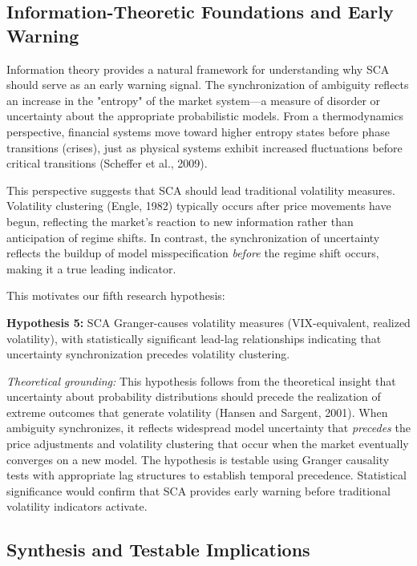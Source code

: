 \documentclass[preprint,12pt,authoryear]{elsarticle}
\begin{document}
\subsection{Information-Theoretic Foundations and Early Warning}

Information theory provides a natural framework for understanding why SCA should serve as an early warning signal. The synchronization of ambiguity reflects an increase in the "entropy" of the market system—a measure of disorder or uncertainty about the appropriate probabilistic models. From a thermodynamics perspective, financial systems move toward higher entropy states before phase transitions (crises), just as physical systems exhibit increased fluctuations before critical transitions (Scheffer et al., 2009).

This perspective suggests that SCA should lead traditional volatility measures. Volatility clustering (Engle, 1982) typically occurs after price movements have begun, reflecting the market's reaction to new information rather than anticipation of regime shifts. In contrast, the synchronization of uncertainty reflects the buildup of model misspecification \textit{before} the regime shift occurs, making it a true leading indicator.

This motivates our fifth research hypothesis:

\begin{center}
\textbf{Hypothesis 5:} SCA Granger-causes volatility measures (VIX-equivalent, realized volatility), with statistically significant lead-lag relationships indicating that uncertainty synchronization precedes volatility clustering.
\end{center}

\noindent
\textit{Theoretical grounding:} This hypothesis follows from the theoretical insight that uncertainty about probability distributions should precede the realization of extreme outcomes that generate volatility (Hansen and Sargent, 2001). When ambiguity synchronizes, it reflects widespread model uncertainty that \textit{precedes} the price adjustments and volatility clustering that occur when the market eventually converges on a new model. The hypothesis is testable using Granger causality tests with appropriate lag structures to establish temporal precedence. Statistical significance would confirm that SCA provides early warning before traditional volatility indicators activate.

\subsection{Synthesis and Testable Implications}
\end{document}
